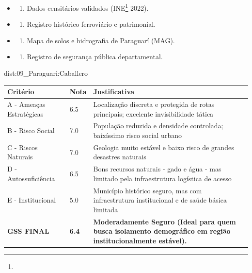 {\begin{itemize}
\tightlist
\item
  \begin{enumerate}
  \def\labelenumi{\arabic{enumi})}
  \tightlist
  \item
    Dados censitários validados (INE\footnote{\fineINE} 2022).
  \end{enumerate}
\item
  \begin{enumerate}
  \def\labelenumi{\arabic{enumi})}
  \setcounter{enumi}{1}
  \tightlist
  \item
    Registro histórico ferroviário e patrimonial.
  \end{enumerate}
\item
  \begin{enumerate}
  \def\labelenumi{\arabic{enumi})}
  \setcounter{enumi}{2}
  \tightlist
  \item
    Mapa de solos e hidrografia de Paraguarí (MAG).
  \end{enumerate}
\item
  \begin{enumerate}
  \def\labelenumi{\arabic{enumi})}
  \setcounter{enumi}{3}
  \tightlist
  \item
    Registro de segurança pública departamental.
  \end{enumerate}
\end{itemize}}{dist:09_Paraguari:Caballero}
\begin{table}[ht!]
\small \begin{tabular}{p{3.0cm}p{0.8cm}p{6.0cm}} \toprule
\textbf{Critério} & \textbf{Nota} & \textbf{Justificativa} \\ \midrule
A - Ameaças Estratégicas & 6.5 & Localização discreta e protegida de rotas principais; excelente invisibilidade tática \\
B - Risco Social & 7.0 & População reduzida e densidade controlada; baixíssimo risco social urbano \\
C - Riscos Naturais & 7.0 & Geologia muito estável e baixo risco de grandes desastres naturais \\
D - Autossuficiência & 6.5 & Bons recursos naturais - gado e água - mas limitado pela infraestrutura logística de acesso \\
E - Institucional & 5.0 & Município histórico seguro, mas com infraestrutura institucional e de saúde básica limitada \\
\midrule \textbf{GSS FINAL} & \textbf{6.4} & \textbf{Moderadamente Seguro (Ideal para quem busca isolamento demográfico em região institucionalmente estável).} \\ \bottomrule \end{tabular}
\end{table}
